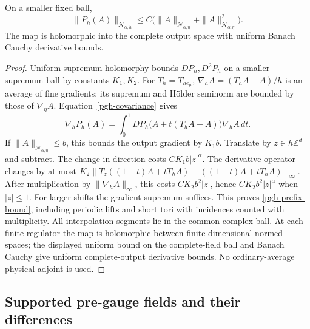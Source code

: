 \begin{lemma}
\label{pgh-prefix-lemma}
On a smaller fixed ball,
\begin{equation}
 \|P_h(A)\|_{\mathcal N_{\alpha,h}}
 \le C\bigl(\|A\|_{\mathcal N_{\alpha,\eta}}
                   +\|A\|_{\mathcal N_{\alpha,\eta}}^2\bigr).
 \label{pgh-prefix-bound}
\end{equation}
The map is holomorphic into the complete output space with uniform
Banach Cauchy derivative bounds.
\end{lemma}
\begin{proof}
Uniform supremum holomorphy bounds $DP_h,D^2P_h$ on a smaller
supremum ball by constants $K_1,K_2$. For $T_h=T_{he_\mu}$,
$\nabla_hA=(T_hA-A)/h$ is an average of fine gradients; its
supremum and H\"older seminorm are bounded by those of
$\nabla_\eta A$. Equation~\eqref{pgh-covariance} gives
\begin{equation}
 \nabla_hP_h(A)=\int_0^1
 DP_h\bigl(A+t(T_hA-A)\bigr)\nabla_hA\,dt.
 \label{pgh-gradient-identity}
\end{equation}
If $\|A\|_{\mathcal N_{\alpha,\eta}}\le b$, this bounds the output
gradient by $K_1b$. Translate by $z\in h\mathbb Z^d$ and subtract.
The change in direction costs $CK_1b|z|^\alpha$. The derivative
operator changes by at most
$K_2\|T_z((1-t)A+tT_hA)-((1-t)A+tT_hA)\|_\infty$.
After multiplication by $\|\nabla_hA\|_\infty$, this costs
$CK_2b^2|z|$, hence $CK_2b^2|z|^\alpha$ when $|z|\le1$.
For larger shifts the gradient supremum suffices. This proves
\eqref{pgh-prefix-bound}, including periodic lifts and short tori
with incidences counted with multiplicity. All interpolation
segments lie in the common complex ball. At each finite regulator
the map is holomorphic between finite-dimensional normed spaces;
the displayed uniform bound on the complete-field ball and
Banach Cauchy give uniform complete-output derivative bounds.
No ordinary-average physical adjoint is used.
\end{proof}

\subsection{Supported pre-gauge fields and their differences}
\label{pgh-support-section}

